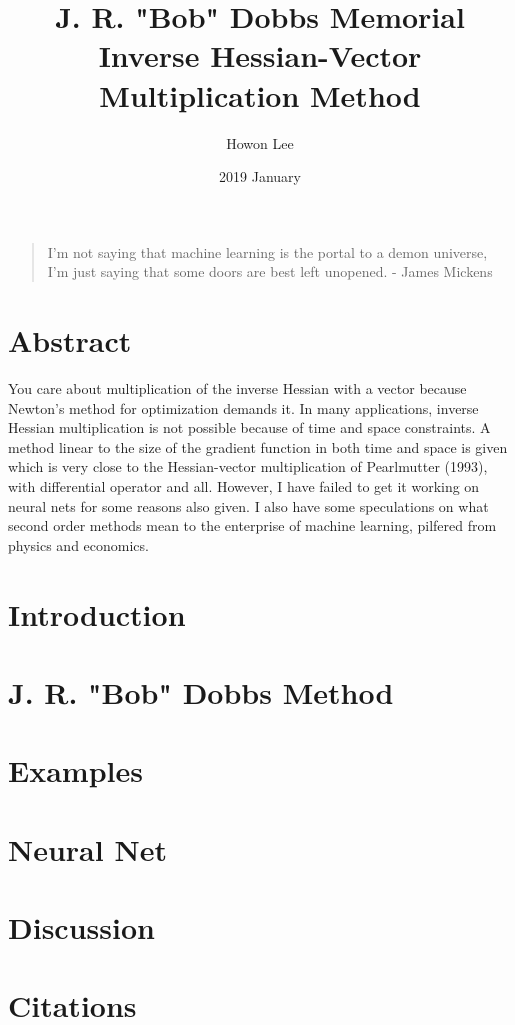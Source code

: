 \documentclass{article}
\begin{document}
\title{J. R. "Bob" Dobbs Memorial Inverse Hessian-Vector Multiplication Method}
\author{Howon Lee}
\date{2019 January}
\maketitle

\begin{quote}
I'm not saying that machine learning is the portal to a demon universe, I'm just saying that some doors are best left unopened. - James Mickens
\end{quote}

\section{Abstract}
You care about multiplication of the inverse Hessian with a vector because Newton's method for optimization demands it. In many applications, inverse Hessian multiplication is not possible because of time and space constraints. A method linear to the size of the gradient function in both time and space is given which is very close to the Hessian-vector multiplication of Pearlmutter (1993), with differential operator and all. However, I have failed to get it working on neural nets for some reasons also given. I also have some speculations on what second order methods mean to the enterprise of machine learning, pilfered from physics and economics.

\section{Introduction}


\section{J. R. "Bob" Dobbs Method}


\section{Examples}


\section{Neural Net}


\section{Discussion}

\section{Citations}

\end{document}
